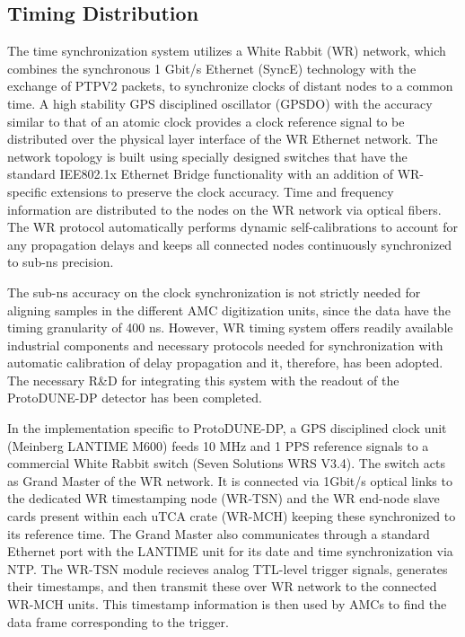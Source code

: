 \subsection{Timing Distribution}
\label{sec:fddp-tpc-elec-wr}
The time synchronization system utilizes a White Rabbit (WR) network, which combines the synchronous 1 Gbit/s Ethernet (SyncE) technology with the exchange of PTPV2 packets, to synchronize clocks of distant nodes to a common time. A high stability GPS disciplined oscillator (GPSDO) with the accuracy similar to that of an atomic clock provides a clock reference signal to be distributed over the physical layer interface of the WR Ethernet network. The network topology is built using specially designed switches that have the standard IEE802.1x Ethernet Bridge functionality with an addition of WR-specific extensions to preserve the clock accuracy. Time and frequency information are distributed to the nodes on the WR network via optical fibers. The WR protocol automatically performs dynamic self-calibrations to account for any propagation delays and keeps all connected nodes continuously synchronized to sub-ns precision. 

The sub-ns accuracy on the clock synchronization is not strictly needed for aligning samples in the different AMC digitization units, since the data have the timing granularity of 400 ns. However, WR timing system offers readily available industrial components and necessary protocols needed for synchronization with automatic calibration of delay propagation and it, therefore, has been adopted. The necessary R\&D for integrating this system with the readout of the ProtoDUNE-DP detector has been completed. 

In the implementation specific to ProtoDUNE-DP, a GPS disciplined clock unit (Meinberg LANTIME M600) feeds 10 MHz and 1 PPS reference signals to a commercial White Rabbit switch (Seven Solutions WRS V3.4). The switch acts as Grand Master of the WR network. It is connected via 1Gbit/s optical links to the dedicated WR timestamping node (WR-TSN) and the WR end-node slave cards present within each uTCA crate (WR-MCH) keeping these synchronized to its reference time. The Grand Master also communicates through a standard Ethernet port with the LANTIME unit for its date and time synchronization via NTP. The WR-TSN module recieves analog TTL-level trigger signals, generates their timestamps, and then transmit these over WR network to the connected WR-MCH units. This timestamp information is then used by AMCs to find the data frame corresponding to the trigger. 

